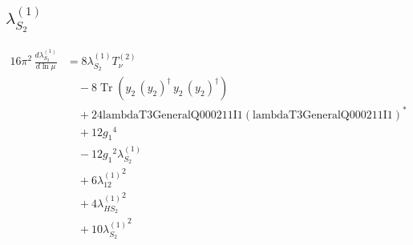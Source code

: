 \documentclass[10pt,a4paper]{article}
\begin{document}
\subsection*{$\lambda_{S_2}^{(1)}$}
\begin{align*}
16\pi^2\,\frac{d \lambda_{S_2}^{(1)}}{d\ln\mu} &=8 {\lambda_{S_2}^{(1)}} T_{\nu}^{(2)} \\
&\quad -8 \operatorname{Tr}\!\left({y_2}\,\left({y_2}\right)^{\dagger}\,{y_2}\,\left({y_2}\right)^{\dagger}\right) \\
&\quad +24 \text{lambdaT3GeneralQ000211I1} \left(\text{lambdaT3GeneralQ000211I1}\right)^{*} \\
&\quad +12 {g_1}^4 \\
&\quad -12 {g_1}^2 {\lambda_{S_2}^{(1)}} \\
&\quad +6 {\lambda_{12}^{(1)}}^2 \\
&\quad +4 {\lambda_{HS_2}^{(1)}}^2 \\
&\quad +10 {\lambda_{S_2}^{(1)}}^2 \\
\end{align*}
\end{document}
